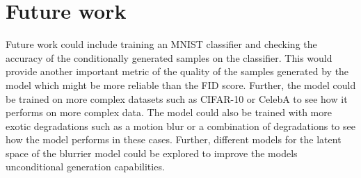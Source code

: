 \documentclass[11pt]{article}
\begin{document}
\section{Future work}
Future work could include training an MNIST classifier and checking the accuracy of the conditionally generated samples on the classifier. This would provide another important metric of the quality of the samples generated by the model which might be more reliable than the FID score. Further, the model could be trained on more complex datasets such as CIFAR-10 or CelebA to see how it performs on more complex data. The model could also be trained with more exotic degradations such as a motion blur or a combination of degradations to see how the model performs in these cases. Further, different models for the latent space of the blurrier model could be explored to improve the models unconditional generation capabilities.



\end{document}
